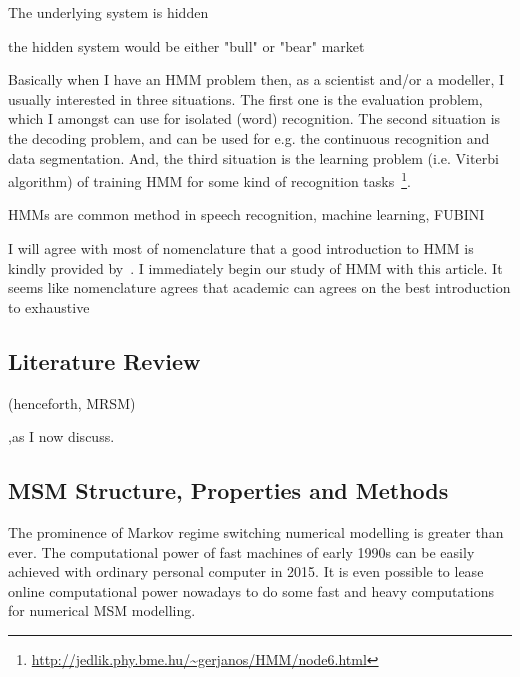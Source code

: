 \documentclass[a4paper,11pt,english]{article}
\begin{document}
		The underlying system is hidden 
		
		the hidden system would be either "bull" or "bear" market
				
		Basically when I have an HMM problem then, as a scientist and/or a modeller, I usually interested in 
		three situations. The first one is the evaluation problem, which I amongst can use for isolated (word) 
		recognition. The second situation is the decoding problem, and can be used for e.g. the continuous 
		recognition and data segmentation. And, the third situation is the learning problem (i.e. Viterbi 
		algorithm) of training HMM for some kind of recognition 
		tasks~\footnote{\url{http://jedlik.phy.bme.hu/~gerjanos/HMM/node6.html}}.		
		
		HMMs are common method in speech recognition, machine learning, FUBINI		

		I will agree with most of nomenclature that a good introduction to HMM is kindly provided by~\citep{rabiner}. I immediately begin our study of 
		HMM with this article. 
		It seems like nomenclature agrees that academic can agrees on the best introduction to exhaustive 		
						
		\subsection{Literature Review}
			
		(henceforth, MRSM)

		,as I now discuss.

		
		\subsection{MSM Structure, Properties and Methods}

				

		The prominence of Markov regime switching numerical modelling is greater than ever. The computational power of fast machines of early 1990s can be
		easily achieved with ordinary personal computer in 2015. It is even possible to lease online computational power nowadays to do some fast and heavy
		computations for numerical MSM modelling. 
		
\end{document}
